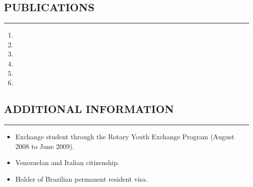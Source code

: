 \documentclass[11pt,letterpaper]{article}
\begin{document}
\subsection*{PUBLICATIONS}
	\vspace{-0.5em}
	\hrule
	\vspace{0.6em}

\begin{enumerate}
	\item {}
	\item {}
	\item {}
	\item {}
	\item {}
	\item {}
\end{enumerate}
	
\subsection*{ADDITIONAL INFORMATION}
	\vspace{-0.5em}
	\hrule
	\vspace{0.8em}
	\begin{itemize}
		\item Exchange student through the Rotary Youth Exchange Program (August 2008 to June 2009).
		\item Venezuelan and Italian citizenship.
		\item Holder of Brazilian permanent resident visa.
	\end{itemize}
	
	
\end{document}
